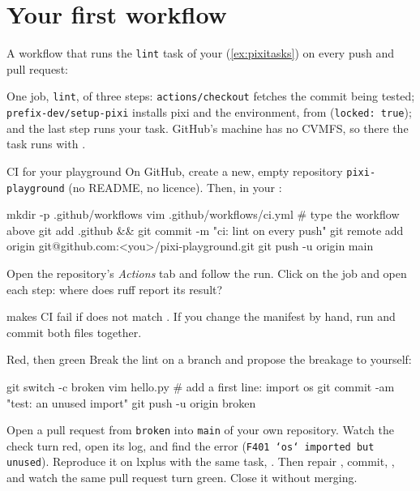 \section{Your first workflow}

A workflow that runs the \texttt{lint} task of your 
(\cref{ex:pixitasks}) on every push and pull request:


One job, \texttt{lint}, of three steps: \texttt{actions/checkout} fetches the
commit being tested; \texttt{prefix-dev/setup-pixi} installs pixi and the
environment, from  (\texttt{locked: true}); and the last step
runs your task. GitHub's machine has no CVMFS, so there the task runs with
.

\begin{exercise}{CI for your playground}
\label{ex:firstci}
On GitHub, create a new, empty repository \texttt{pixi-playground} (no
README, no licence). Then, in your :
\begin{shell}
mkdir -p .github/workflows
vim .github/workflows/ci.yml     # type the workflow above
git add .github && git commit -m "ci: lint on every push"
git remote add origin git@github.com:<you>/pixi-playground.git
git push -u origin main
\end{shell}
Open the repository's \emph{Actions} tab and follow the run. Click on the job
and open each step: where does ruff report its result?
\end{exercise}

\begin{pitfall}
 makes CI fail if  does not match
. If you change the manifest by hand, run  and
commit both files together.
\end{pitfall}

\begin{exercise}{Red, then green}
\label{ex:redgreen}
Break the lint on a branch and propose the breakage to yourself:
\begin{shell}
git switch -c broken
vim hello.py     # add a first line: import os
git commit -am "test: an unused import"
git push -u origin broken
\end{shell}
Open a pull request from \texttt{broken} into \texttt{main} of your own
repository. Watch the check turn red, open its log, and find the error
(\texttt{F401 `os` imported but unused}). Reproduce it on lxplus with the
same task, . Then repair , commit, , and watch the
same pull request turn green. Close it without merging.
\end{exercise}

